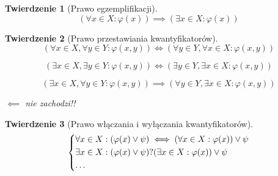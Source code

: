 \documentclass[a5paper,8pt]{article}
\theoremstyle{mythmstyle}
\newtheorem{theorem}{Twierdzenie}[section]
\begin{document}
            \begin{theorem}[Prawo egzemplifikacji]
                \begin{equation*}
                    ( \forall x \in X : \varphi(x) ) \implies ( \exists x \in X : \varphi(x) )
                \end{equation*}
            \end{theorem}

            \begin{theorem}[Prawo przestawiania kwantyfikatorów]

                \begin{equation*}
                    (\forall x \in X, \forall y \in Y : \varphi(x, y)) \iff ( \forall y \in Y, \forall x \in X : \varphi(x, y))
                \end{equation*}

                \begin{equation*}
                    (\exists x \in X, \exists y \in Y : \varphi(x, y)) \iff ( \exists y \in Y, \exists x \in X : \varphi(x, y))
                \end{equation*}

                \begin{equation*}
                    (\exists x \in X, \forall y \in Y : \varphi(x, y)) \implies ( \forall y \in Y, \exists x \in X : \varphi(x, y))
                \end{equation*}

                \begin{center}
                    $ \impliedby $ nie zachodzi!!
                \end{center}

            \end{theorem}

            \begin{theorem}[Prawo włączania i wyłączania kwantyfikatorów]

                \[
                    \begin{dcases*}
                    \forall x \in X : (\varphi(x) \vee \psi) \iff (\forall x \in X : \varphi(x)) \vee \psi \\
                    \exists x \in X : (\varphi(x) \vee \psi) ? (\exists x \in X : \varphi(x)) \vee \psi \\
                    \ldots
                    \end{dcases*}
                \]

            \end{theorem}
\end{document}
